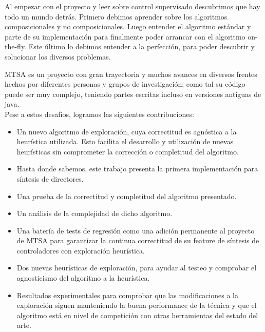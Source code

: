 % 
% 

Al empezar con el proyecto y leer sobre control supervisado descubrimos que hay todo un mundo detrás. Primero debimos aprender sobre los algoritmos composicionales y no composicionales. Luego entender el algoritmo estándar y parte de su implementación para finalmente poder arrancar con el algoritmo on-the-fly. Este último lo debimos entender a la perfección, para poder descubrir y solucionar los diversos problemas. 

MTSA es un proyecto con gran trayectoria y muchos avances en diversos frentes hechos por diferentes personas y grupos de investigación; como tal su código puede ser muy complejo, teniendo partes escritas incluso en versiones antiguas de java.\\

Pese a estos desafíos, logramos las siguientes contribuciones: 
\begin{itemize}
	
	\item Un nuevo algoritmo de exploración, cuya correctitud es agnóstica a la heurística utilizada. Esto facilita el desarrollo y utilización de nuevas heurísticas sin comprometer la corrección o completitud del algoritmo.
	
	\item Hasta donde sabemos, este trabajo presenta la primera implementación para síntesis de directores.
	
	\item Una prueba de la correctitud y completitud del algoritmo presentado.
	
	\item Un análisis de la complejidad de dicho algoritmo.
	
	\item Una batería de tests de regresión como una adición permanente al proyecto de MTSA para garantizar la continua correctitud de su feature de síntesis de controladores con exploración heurística.
	
	\item Dos nuevas heurísticas de exploración, para ayudar al testeo y comprobar el agnosticismo del algoritmo a la heurística.
	
	\item Resultados experimentales para comprobar que las modificaciones a la exploración siguen manteniendo la buena performance de la técnica y que el algoritmo está en nivel de competición con otras herramientas del estado del arte.
\end{itemize}

